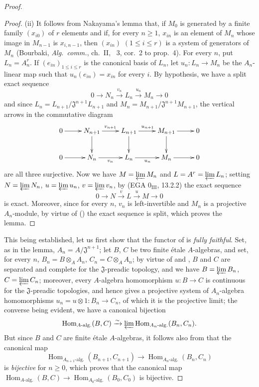 \begin{proof}
\begin{proof}
(ii) It follows from Nakayama's lemma that, if $M_0$ is generated by a finite family $(x_{i0})$ of $r$ elements and if, for every $n\geq 1$, $x_{in}$ is an element of $M_n$ whose image in $M_{n-1}$ is $x_{i,n-1}$, then $(x_{in})$ $(1\leq i\leq r)$ is a system of generators of $M_n$ (Bourbaki, \emph{Alg.\ comm.}, ch.~II, \textsection~3, cor.~2 to prop.~4).  For every $n$, put $L_n=A_n^r$.  If $(e_{in})_{1\leq i\leq r}$ is the canonical basis of $L_n$, let $u_n:L_n\to M_n$ be the $A_n$-linear map such that $u_n(e_{in})=x_{in}$ for every $i$.
By hypothesis, we have a split exact sequence
\[
0\to N_n\xrightarrow{v_n} L_n\xrightarrow{u_n} M_n\to 0
\]
and since $L_n=L_{n+1}/\mathfrak{J}^{n+1}L_{n+1}$ and $M_n=M_{n+1}/\mathfrak{J}^{n+1}M_{n+1}$, the vertical arrows in the commutative diagram
\[
\xymatrix{
0\ar[r] & N_{n+1}\ar[r]^{v_{n+1}}\ar[d] & L_{n+1}\ar[r]^{u_{n+1}}\ar[d] & M_{n+1}\ar[r]\ar[d] & 0\\
0\ar[r] & N_n\ar[r]_{v_n} & L_n\ar[r]_{u_n} & M_n\ar[r] & 0
}
\]
are all three surjective.
Now we have $M=\varprojlim M_n$ and $L=A^r=\varprojlim L_n$;
setting $N=\varprojlim N_n$, $u=\varprojlim u_n$, $v=\varprojlim v_n$, by (EGA $0_{\mathrm{III}}$, 13.2.2) the exact sequence
\[
\label{IV.18.3.2.2}
0\to N\xrightarrow{v} L\xrightarrow{u} M\to 0
\tag{18.3.2.2}
\]
is exact.
Moreover, since for every $n$, $v_n$ is left-invertible and $M_n$ is a projective $A_n$-module, by virtue of () the exact sequence  is split, which proves the lemma.
\end{proof}

This being established, let us first show that the functor of  is \emph{fully faithful}.
Set, as in the lemma, $A_n=A/\mathfrak{J}^{n+1}$;
let $B$, $C$ be two finite \'etale $A$-algebras, and set, for every $n$, $B_n=B\otimes_A A_n$, $C_n=C\otimes_A A_n$;
by virtue of  and , $B$ and $C$ are separated and complete for the $\mathfrak{J}$-preadic topology, and we have $B=\varprojlim B_n$, $C=\varprojlim C_n$;
moreover, every $A$-algebra homomorphism $u:B\to C$ is continuous for the $\mathfrak{J}$-preadic topologies, and hence gives a projective system of $A_n$-algebra homomorphisms $u_n=u\otimes 1:B_n\to C_n$, of which it is the projective limit;
the converse being evident, we have a canonical bijection
\[
\operatorname{Hom}_{A\text{-}\mathrm{alg.}}(B,C)\xrightarrow{\sim}\varprojlim\operatorname{Hom}_{A_n\text{-}\mathrm{alg.}}(B_n,C_n).
\]
But since $B$ and $C$ are finite \'etale $A$-algebras, it follows also from  that the canonical map
\[
\operatorname{Hom}_{A_{n+1}\text{-}\mathrm{alg.}}(B_{n+1},C_{n+1})\to\operatorname{Hom}_{A_n\text{-}\mathrm{alg.}}(B_n,C_n)
\]
is \emph{bijective} for $n\geq 0$, which proves that the canonical map $\operatorname{Hom}_{A\text{-}\mathrm{alg.}}(B,C)\to\operatorname{Hom}_{A_0\text{-}\mathrm{alg.}}(B_0,C_0)$ is bijective.


\end{proof}
